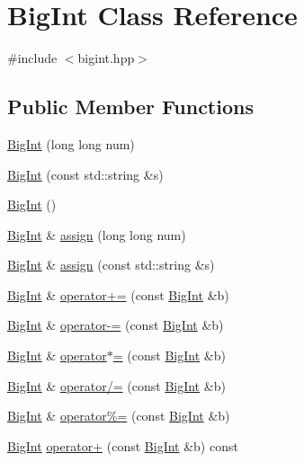 \hypertarget{class_big_int}{}\section{Big\+Int Class Reference}
\label{class_big_int}


{\ttfamily \#include $<$bigint.\+hpp$>$}

\subsection*{Public Member Functions}
\begin{DoxyCompactItemize}
\item 
\hyperlink{class_big_int_a4421e6c1883874512f1b04543dafc64a}{Big\+Int} (long long num)
\item 
\hyperlink{class_big_int_abe13ffcbf871ddb97365a73120ca0b6f}{Big\+Int} (const std\+::string \&s)
\item 
\hyperlink{class_big_int_af677021c0987fc2a48da06837ed29c58}{Big\+Int} ()
\item 
\hyperlink{class_big_int}{Big\+Int} \& \hyperlink{class_big_int_a43652944006a9ace4fa3d8e1c0ed3213}{assign} (long long num)
\item 
\hyperlink{class_big_int}{Big\+Int} \& \hyperlink{class_big_int_acc4942cf0af7096ec328735c75f8fcfe}{assign} (const std\+::string \&s)
\item 
\hyperlink{class_big_int}{Big\+Int} \& \hyperlink{class_big_int_a5768b8d21f3cc80a85cdea09a8769a22}{operator+=} (const \hyperlink{class_big_int}{Big\+Int} \&b)
\item 
\hyperlink{class_big_int}{Big\+Int} \& \hyperlink{class_big_int_a164befb196d794282a927e1a490bb939}{operator-\/=} (const \hyperlink{class_big_int}{Big\+Int} \&b)
\item 
\hyperlink{class_big_int}{Big\+Int} \& \hyperlink{class_big_int_aaf4a32e323d4f67fc6c04462ed812461}{operator$\ast$=} (const \hyperlink{class_big_int}{Big\+Int} \&b)
\item 
\hyperlink{class_big_int}{Big\+Int} \& \hyperlink{class_big_int_a72d43b327dc95e500d71c667f891cbb8}{operator/=} (const \hyperlink{class_big_int}{Big\+Int} \&b)
\item 
\hyperlink{class_big_int}{Big\+Int} \& \hyperlink{class_big_int_aa88327d018c8dc6fbb006e1b8b9ce964}{operator\%=} (const \hyperlink{class_big_int}{Big\+Int} \&b)
\item 
\hyperlink{class_big_int}{Big\+Int} \hyperlink{class_big_int_a468c8997e2ec45ef37d5ff32becc5818}{operator+} (const \hyperlink{class_big_int}{Big\+Int} \&b) const 

\end{DoxyCompactItemize}
